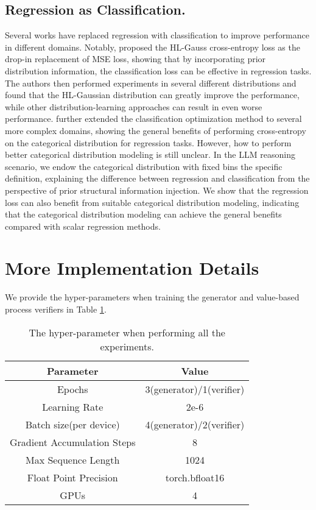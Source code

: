 \subsection{Regression as Classification.}
Several works have replaced regression with classification to improve performance in different domains\citep{DBLP:journals/jair/WeissI95,DBLP:conf/iclr/ZhangYMZY23}. Notably, \citet{DBLP:conf/icml/ImaniW18} proposed the HL-Gauss cross-entropy loss as the drop-in replacement of MSE loss, showing that by incorporating prior distribution information, the classification loss can be effective in regression tasks. The authors then performed experiments in several different distributions and found that the HL-Gaussian distribution can greatly improve the performance, while other distribution-learning approaches can result in even worse performance. \citet{DBLP:conf/icml/FarebrotherOVTC24} further extended the classification optimization method to several more complex domains, showing the general benefits of performing cross-entropy on the categorical distribution for regression tasks. However, how to perform better categorical distribution modeling is still unclear. In the LLM reasoning scenario, we endow the categorical distribution with fixed bins the specific definition, explaining the difference between regression and classification from the perspective of prior structural information injection. We show that the regression loss can also benefit from suitable categorical distribution modeling, indicating that the categorical distribution modeling can achieve the general benefits compared with scalar regression methods.

\section{More Implementation Details}
We provide the hyper-parameters when training the generator and value-based process verifiers in Table \ref{tab:hyperparams}.
\begin{table}[h!]
    \centering
    \begin{tabular}{c|c}
    \toprule
      Parameter   &  Value \\
    \midrule
      Epochs & 3(generator)/1(verifier) \\
      Learning Rate   &  2e-6 \\
      Batch size(per device) & 4(generator)/2(verifier) \\
      Gradient Accumulation Steps & 8 \\
      Max Sequence Length & 1024 \\
      Float Point Precision & torch.bfloat16 \\
      GPUs & 4 \\
    \bottomrule
    \end{tabular}
    \caption{The hyper-parameter when performing all the experiments.}
    \label{tab:hyperparams}
\end{table}


